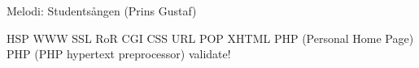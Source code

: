 \begin{song}

\begin{songmeta}
Melodi: Studentsången (Prins Gustaf)
\end{songmeta}

\begin{songtext}
HSP WWW
SSL RoR
CGI CSS
URL
POP
XHTML
PHP (Personal Home Page)
PHP (PHP hypertext preprocessor)
validate!
\end{songtext}
\end{song}
